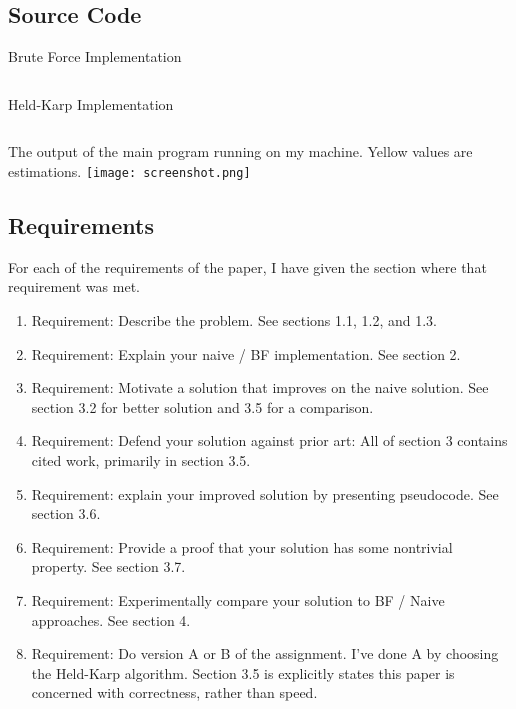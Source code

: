 \documentclass[11pt,fleqn]{article}
\begin{document}
\newpage
\subsection{Source Code}
  Brute Force Implementation
  \inputminted[linenos=true]{python}{../src/brute_force.py}
  \newpage
  Held-Karp Implementation
  \inputminted[linenos=true]{python}{../src/held_karp.py}
  The output of the main program running on my machine.
  Yellow values are estimations.
  \texttt{[image: screenshot.png]}

\newpage
\subsection{Requirements}
For each of the requirements of the paper, I have given
the section where that requirement was met.
\begin{enumerate}
  \item Requirement: Describe the problem.  See sections 1.1, 1.2, and 1.3.
  \item Requirement: Explain your naive / BF implementation.  See section 2.
  \item Requirement: Motivate a solution that improves on the naive solution.
    See section 3.2 for better solution and 3.5 for a comparison.
  \item Requirement: Defend your solution against prior art: All of section
    3 contains cited work, primarily in section 3.5.
  \item Requirement: explain your improved solution by presenting pseudocode.  See section 3.6.
  \item Requirement: Provide a proof that your solution has some nontrivial property.  See section 3.7.
  \item Requirement: Experimentally compare your solution to BF / Naive approaches.  See section 4.
  \item Requirement: Do version A or B of the assignment.  I've done A by choosing the Held-Karp algorithm.
    Section 3.5 is explicitly states this paper is concerned with correctness, rather than speed.
\end{enumerate}

\newpage


\end{document}
